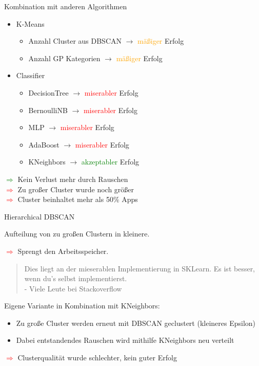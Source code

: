 \documentclass[compress,t]{beamer}
\begin{document}
\begin{frame}{Kombination mit anderen Algorithmen}

    \begin{itemize}
        \item K-Means
            \begin{itemize}
                \item Anzahl Cluster aus DBSCAN \(\rightarrow\) \textcolor{orange}{mäßiger} Erfolg
                \item Anzahl GP Kategorien \(\rightarrow\) \textcolor{orange}{mäßiger} Erfolg
            \end{itemize}
        \item Classifier
            \begin{itemize}
                \item DecisionTree \(\rightarrow\) \textcolor{red}{miserabler} Erfolg
                \item BernoulliNB \(\rightarrow\) \textcolor{red}{miserabler} Erfolg
                \item MLP \(\rightarrow\) \textcolor{red}{miserabler} Erfolg
                \item AdaBoost \(\rightarrow\) \textcolor{red}{miserabler} Erfolg
                \item KNeighbors  \(\rightarrow\) \textcolor{green}{akzeptabler} Erfolg
            \end{itemize}
    \end{itemize}

    \textcolor{green}{\(\Rightarrow\)} Kein Verlust mehr durch Rauschen\\
    \textcolor{red}{\(\Rightarrow\)} Zu großer Cluster wurde noch größer\\
    \textcolor{red}{\(\Rightarrow\)} Cluster beinhaltet mehr als 50\% Apps

\end{frame}

\begin{frame}{Hierarchical DBSCAN}

    Aufteilung von zu großen Clustern in kleinere.

    \textcolor{red}{\(\Rightarrow\)} Sprengt den Arbeitsspeicher.
    \begin{quote}
        Dies liegt an der mieserablen Implementierung in SKLearn.
        Es ist besser, wenn du's selbst implementierst.\\
        - Viele Leute bei Stackoverflow
    \end{quote}

    Eigene Variante in Kombination mit KNeighbors:
    \begin{itemize}
        \item Zu große Cluster werden erneut mit DBSCAN geclustert (kleineres Epsilon)
        \item Dabei entstandendes Rauschen wird mithilfe KNeighbors neu verteilt
    \end{itemize}

    \textcolor{red}{\(\Rightarrow\)} Clusterqualität wurde schlechter, kein guter Erfolg

\end{frame}
\end{document}
